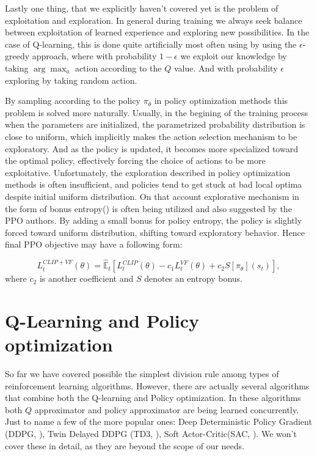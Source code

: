 \pagebreak
Lastly one thing, that we explicitly haven't covered yet is the problem of exploitation and exploration.
In general during training we always seek balance between exploitation of learned experience and exploring new possibilities.
In the case of Q-learning, this is done  quite artificially most often using by using the $\epsilon$-greedy approach, where with probability $1-\epsilon$ we exploit our knowledge by taking $\arg \max_a$ action according to the $Q$ value.
And with probability $\epsilon$ exploring by taking random action.

By sampling according to the policy $\pi_\theta$ in policy optimization methods this problem is solved more naturally.
Usually, in the begining of the training process when the parameters are initialized, the parametrized probability distribution is close to uniform, which implicitly makes the action selection mechanism to be exploratory.
And as the policy is updated, it becomes more specialized toward the optimal policy, effectively forcing the choice of actions to be more exploitative.
Unfortunately, the exploration described in policy optimization methods is often insufficient, and policies tend to get stuck at bad local optima despite initial uniform distribution.
On that account explorative mechanism in the form of bonus entropy(\cite{EntropyRegularization}) is often being utilized and also suggested by the PPO authors.
By adding a small bonus for policy entropy, the policy is slightly forced toward uniform distribution, shifting toward exploratory behavior.
Hence final PPO objective may have a following form:

\[
  L_t^{CLIP+VF}(\theta) =   \hat{\mathbb{E}}_t \left[L_t^{CLIP}(\theta) - c_1 L_t^{VF}(\theta)  + c_2S[\pi_\theta](s_t)\right],
\]
where $c_2$ is another coefficient and $S$ denotes an entropy bonus.


\section*{Q-Learning and Policy optimization}\label{QPlusPolicy}
So far we have covered possible the simplest division rule among types of reinforcement learning algorithms.
However, there are actually several algorithms that combine both the Q-learning and Policy optimization.
In these algorithms both $Q$ approximator and policy approximator are being learned concurrently.
Just to name a few of the more popular ones: Deep Deterministic Policy Gradient (DDPG, \cite{DDPG}), Twin Delayed DDPG (TD3, \cite{TD3}), Soft Actor-Critic(SAC, \cite{SAC}).
We won't cover these in detail, as they are beyond the scope of our needs.




